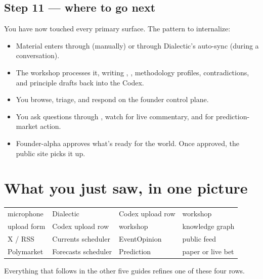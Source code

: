 \documentclass[11pt]{article}
\begin{document}
\subsection{Step 11 --- where to go next}

You have now touched every primary surface. The pattern to
internalize:

\begin{itemize}[leftmargin=*,itemsep=0.2em]
  \item Material enters through  (manually) or through
        Dialectic's auto-sync (during a conversation).
  \item The workshop processes it, writing ,
        , methodology profiles, contradictions, and
        principle drafts back into the Codex.
  \item You browse, triage, and respond on the founder control plane.
  \item You ask questions through , watch 
        for live commentary, and  for prediction-market
        action.
  \item Founder-alpha approves what's ready for the world. Once
        approved, the public site picks it up.
\end{itemize}

\section{What you just saw, in one picture}

\begin{center}
\begin{tabular}{l@{\;\(\to\)\;}l@{\;\(\to\)\;}l@{\;\(\to\)\;}l}
\sffamily microphone & \sffamily Dialectic & \sffamily Codex upload row & \sffamily workshop \\
\sffamily upload form & \sffamily Codex upload row & \sffamily workshop & \sffamily knowledge graph \\
\sffamily X / RSS & \sffamily Currents scheduler & \sffamily EventOpinion & \sffamily public feed \\
\sffamily Polymarket & \sffamily Forecasts scheduler & \sffamily Prediction & \sffamily paper or live bet \\
\end{tabular}
\end{center}

Everything that follows in the other five guides refines one of these
four rows.
\end{document}
